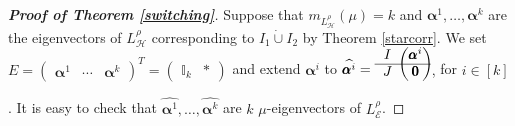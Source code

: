 \documentclass{amsart}
\theoremstyle{remark}
\begin{document}
\begin{proof}[\textbf{Proof of Theorem \ref{switching}}]
Suppose that $m_{L_{\mathcal{H}}^{\rho}}(\mu)=k$ and $\pmb{\alpha}^{1},\ldots,\pmb{\alpha}^{k}$ are the eigenvectors of $L_{\mathcal{H}}^{\rho}$ corresponding to $I_{1}\dot{\cup} I_{2}$ by Theorem \ref{starcorr}. We set
{\footnotesize
$E=\left(\begin{array}{c|c|c}
 \pmb{\alpha}^{1} & \cdots & \pmb{\alpha}^{k}
\end{array}\right)^{T}=
\left(\begin{array}{c|c}
 \mathbb{I}_{k} & \ast
\end{array}\right)$}
and extend $\pmb{\alpha}^{i}$ to {\footnotesize $\widehat{\pmb{\alpha}^{i}}=\begin{blockarray}{cc}
\begin{block}{c(c)}
  I& \pmb{\alpha}^{i}\\\cline{1-2}
  J&\pmb{0}  \\
\end{block}
\end{blockarray}$,} for $i\in [k]$.
It is easy to check that $\widehat{\pmb{\alpha}^{1}},\ldots,\widehat{\pmb{\alpha}^{k}}$ are $k$ $\mu$-eigenvectors of $L_{\mathcal{E}}^{\rho}$.


\end{proof}
\end{document}
